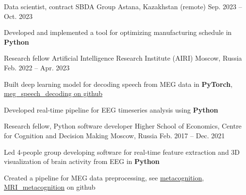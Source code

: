
\begin{cventries}
  \cventry
    {Data scientist, contract}
    {SBDA Group}
    {Astana, Kazakhstan (remote)}
    {Sep. 2023 -- Oct. 2023}
    {
      \begin{cvitems}
          \item Developed and implemented a tool for optimizing manufacturing schedule in \textbf{Python}
      \end{cvitems}
    }
  \cventry
    {Research fellow}
    {Artificial Intelligence Research Institute (AIRI)}
    {Moscow, Russia}
    {Feb. 2022 -- Apr. 2023}
    {
      \begin{cvitems}
      \item Built deep learning model for decoding speech from MEG data in \textbf{PyTorch},
          \href{https://github.com/dmalt/meg_speech_decoding}{meg\_speech\_decoding on github}
      \item Developed real-time pipeline for EEG timeseries analysis using
          \textbf{Python}
      \end{cvitems}
    }
  \cventry
    {Research fellow, Python software developer}
    {Higher School of Economics, Centre for Cognition and Decision Making}
    {Moscow, Russia}
    {Feb. 2017 -- Dec. 2021}
    {
      \begin{cvitems}
      \item{Led 4-people group developing software for real-time feature extraction and 3D visualization of brain activity from EEG in \textbf{Python}}
      \item{Created a pipeline for MEG data preprocessing, see \href{https://github.com/dmalt/metacognition}{metacognition}, \href{https://github.com/dmalt/MRI_metacognition}{MRI\_metacognition}} on github
      \end{cvitems}
    }

\end{cventries}
